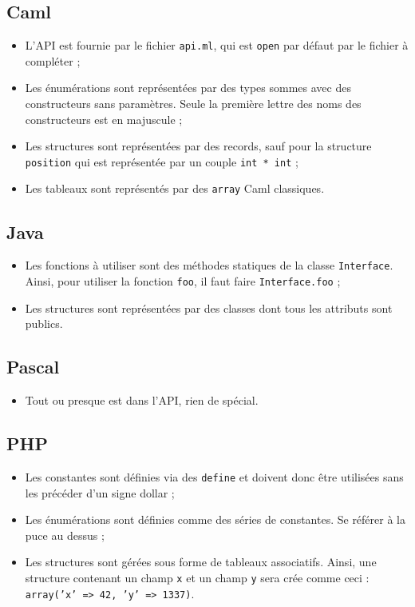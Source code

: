\subsection{Caml}

\begin{itemize}
\item{L'API est fournie par le fichier \texttt{api.ml}, qui est \texttt{open}
      par défaut par le fichier à compléter ;}
\item{Les énumérations sont représentées par des types sommes avec des
      constructeurs sans paramètres. Seule la première lettre des noms des
      constructeurs est en majuscule ;}
\item{Les structures sont représentées par des records, sauf pour la structure
      \texttt{position} qui est représentée par un couple \texttt{int * int} ;}
\item{Les tableaux sont représentés par des \texttt{array} Caml classiques.}
\end{itemize}

\subsection{Java}

\begin{itemize}
\item{Les fonctions à utiliser sont des méthodes statiques de la classe
      \texttt{Interface}. Ainsi, pour utiliser la fonction \texttt{foo}, il
      faut faire \texttt{Interface.foo} ;}
\item{Les structures sont représentées par des classes dont tous les attributs
      sont publics.}
\end{itemize}

\subsection{Pascal}

\begin{itemize}
\item{Tout ou presque est dans l'API, rien de spécial.}
\end{itemize}

\subsection{PHP}

\begin{itemize}
\item{Les constantes sont définies via des \texttt{define} et doivent donc être
      utilisées sans les précéder d'un signe dollar ;}
\item{Les énumérations sont définies comme des séries de constantes. Se référer
      à la puce au dessus ;}
\item{Les structures sont gérées sous forme de tableaux associatifs. Ainsi, une
      structure contenant un champ \texttt{x} et un champ \texttt{y} sera crée
      comme ceci : \texttt{array('x' => 42, 'y' => 1337)}.}
\end{itemize}

